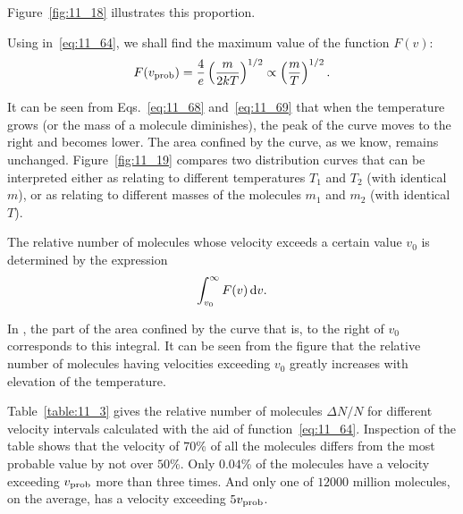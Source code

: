 \noindent
Figure~\ref{fig:11_18} illustrates this proportion.

Using  in~\eqref{eq:11_64}, we shall find the maximum value of the function $F(v)$:
\vspace{-12pt}
\begin{equation}\label{eq:11_69}
	F(v_{\text{prob}}) = \frac{4}{e}\left(\frac{m}{2kT}\right)^{1/2} \propto \left(\frac{m}{T}\right)^{1/2}.
\end{equation}

\noindent
It can be seen from Eqs.~\eqref{eq:11_68} and~\eqref{eq:11_69} that when the temperature grows (or the mass of a molecule diminishes), the peak of the curve moves to the right and becomes lower. The area confined by the curve, as we know, remains unchanged. Figure~\ref{fig:11_19} compares two distribution curves that can be interpreted either as relating to different temperatures $T_1$ and $T_2$ (with identical $m$), or as relating to different masses of the molecules $m_1$ and $m_2$ (with identical $T$).

The relative number of molecules whose velocity exceeds a certain value $v_0$ is determined by the expression
\begin{equation*}
	\int_{v_0}^{\infty} F(v)\,\mathrm{d} v.
\end{equation*}

\noindent
In , the part of the area confined by the curve that is, to the right of $v_0$ corresponds to this integral. It can be seen from the figure that the relative number of molecules having velocities exceeding $v_0$ greatly increases with elevation of the temperature.

Table~\ref{table:11_3} gives the relative number of molecules $\Delta N/N$ for different velocity intervals calculated with the aid of function~\eqref{eq:11_64}. Inspection of the table shows that the velocity of $70$\% of all the molecules differs from the most probable value by not over $50$\%. Only $0.04$\% of the molecules have a velocity exceeding $v_{\text{prob}}$ more than three times. And only one of $12000$ million molecules, on the average, has a velocity exceeding $5v_{\text{prob}}$.

\begin{table}[!b]
	\renewcommand{\arraystretch}{1.2}
	\caption{ }
	\vspace{-0.6cm}
	\label{table:11_3}
	\begin{center}\end{center}
\end{table}

